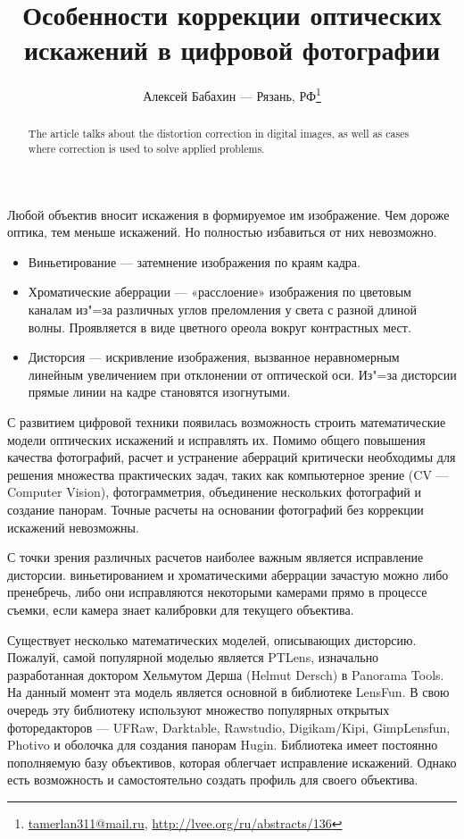 \documentclass[10pt, a5paper]{article}
\begin{document}
\title{Особенности коррекции оптических искажений в цифровой фотографии}
\author{Алексей Бабахин --- Рязань, РФ\footnote{\url{tamerlan311@mail.ru}, \url{http://lvee.org/ru/abstracts/136}}}
\maketitle
\begin{abstract}
The article talks about the distortion correction in digital images, as well as cases where correction is used to solve applied problems.
\end{abstract}
Любой объектив вносит искажения в формируемое им изображение. Чем дороже оптика, тем меньше искажений. Но полностью избавиться от них невозможно.

\begin{itemize}
  \item Виньетирование --- затемнение изображения по краям кадра.
  \item Хроматические аберрации --- «расслоение» изображения по цветовым каналам из"=за различных углов преломления у света с разной длиной волны. Проявляется в виде цветного ореола вокруг контрастных мест.
  \item Дисторсия --- искривление изображения, вызванное неравномерным линейным увеличением при отклонении от оптической оси. Из"=за дисторсии прямые линии на кадре становятся изогнутыми.
\end{itemize}

С развитием цифровой техники появилась возможность строить математические модели оптических искажений и исправлять их. Помимо общего повышения качества фотографий, расчет и устранение аберраций критически необходимы для решения множества практических задач, таких как компьютерное зрение (CV --- Compu\-ter Vision), фотограмметрия, объединение нескольких фотографий и создание панорам. Точные расчеты на основании фотографий без коррекции искажений невозможны.

С точки зрения различных расчетов наиболее важным является исправление дисторсии. виньетированием и хроматическими аберрации зачастую можно либо пренебречь, либо они исправляются некоторыми камерами прямо в процессе съемки, если камера знает калибровки для текущего объектива.

Существует несколько математических моделей, описывающих дисторсию. Пожалуй, самой популярной моделью является PTLens, изначально разработанная доктором Хельмутом Дерша (Helmut \linebreak Dersch) в Panorama Tools. На данный момент эта модель является основной в библиотеке LensFun. В свою очередь эту библиотеку используют множество популярных открытых фоторедакторов --- UFRaw, Darktable, Rawstudio, Digikam/Kipi, GimpLensfun, Photivo и оболочка для создания панорам Hugin. Библиотека имеет постоянно пополняемую базу объективов, которая облегчает исправление искажений. Однако есть возможность и самостоятельно создать профиль для своего объектива.
\end{document}
